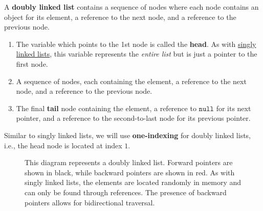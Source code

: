   \begin{definition}
    \label{def:doubly-linked-list}
    A \textbf{doubly linked list} contains a sequence of nodes where each node contains an object for its element, a reference to the next node, and a reference to the previous node.
    \begin{enumerate}
      \item The variable which points to the 1st node is called the \textbf{head}. As with \hyperref[def:singly-linked-list]{singly linked lists}, this variable represents the \textit{entire list} but is just a pointer to the first node.
      \item A sequence of nodes, each containing the element, a reference to the next node, and a reference to the previous node.
      \item The final \textbf{tail} node containing the element, a reference to $\texttt{null}$ for its next pointer, and a reference to the second-to-last node for its previous pointer.
    \end{enumerate}
    Similar to singly linked lists, we will use \textbf{one-indexing} for doubly linked lists, i.e., the head node is located at index $1$.
    \begin{figure}[H]
      \centering 
      \caption{This diagram represents a doubly linked list. Forward pointers are shown in black, while backward pointers are shown in red. As with singly linked lists, the elements are located randomly in memory and can only be found through references. The presence of backward pointers allows for bidirectional traversal.}
      \label{fig:doubly_linked_list}
    \end{figure}
  \end{definition} 

